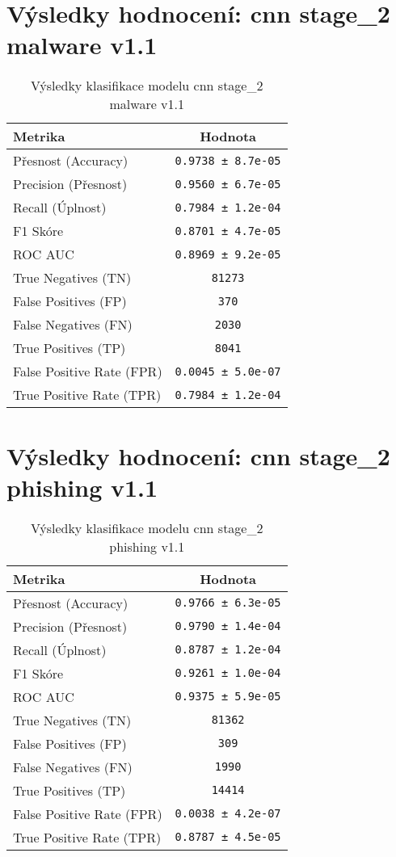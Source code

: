 \section*{Výsledky hodnocení: cnn stage_2 malware v1.1}
\begin{table}[h!]
\centering
\begin{tabular}{|l|c|}
\hline
\textbf{Metrika} & \textbf{Hodnota} \\
\hline
Přesnost (Accuracy) & \texttt{0.9738 ± 8.7e-05} \\
Precision (Přesnost) & \texttt{0.9560 ± 6.7e-05} \\
Recall (Úplnost) & \texttt{0.7984 ± 1.2e-04} \\
F1 Skóre & \texttt{0.8701 ± 4.7e-05} \\
ROC AUC & \texttt{0.8969 ± 9.2e-05} \\
True Negatives (TN) & \texttt{81273} \\
False Positives (FP) & \texttt{370} \\
False Negatives (FN) & \texttt{2030} \\
True Positives (TP) & \texttt{8041} \\
False Positive Rate (FPR) & \texttt{0.0045 ± 5.0e-07} \\
True Positive Rate (TPR) & \texttt{0.7984 ± 1.2e-04} \\
\hline
\end{tabular}
\caption{Výsledky klasifikace modelu cnn stage_2 malware v1.1}
\label{tab:malware_cnn}
\end{table}

\section*{Výsledky hodnocení: cnn stage_2 phishing v1.1}
\begin{table}[h!]
\centering
\begin{tabular}{|l|c|}
\hline
\textbf{Metrika} & \textbf{Hodnota} \\
\hline
Přesnost (Accuracy) & \texttt{0.9766 ± 6.3e-05} \\
Precision (Přesnost) & \texttt{0.9790 ± 1.4e-04} \\
Recall (Úplnost) & \texttt{0.8787 ± 1.2e-04} \\
F1 Skóre & \texttt{0.9261 ± 1.0e-04} \\
ROC AUC & \texttt{0.9375 ± 5.9e-05} \\
True Negatives (TN) & \texttt{81362} \\
False Positives (FP) & \texttt{309} \\
False Negatives (FN) & \texttt{1990} \\
True Positives (TP) & \texttt{14414} \\
False Positive Rate (FPR) & \texttt{0.0038 ± 4.2e-07} \\
True Positive Rate (TPR) & \texttt{0.8787 ± 4.5e-05} \\
\hline
\end{tabular}
\caption{Výsledky klasifikace modelu cnn stage_2 phishing v1.1}
\label{tab:phishing_cnn}
\end{table}

